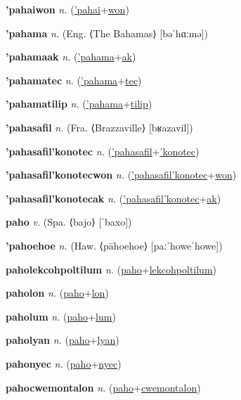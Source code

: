 \textbf{\hypertarget{'pahaiwon}{'pahaiwon}} \textit{n.} (\hyperlink{'pahai}{'pahai}+\allowbreak \hyperlink{won}{won})


\textbf{\hypertarget{'pahama}{'pahama}} \textit{n.} (Eng. ⟨The Bahamas⟩ [bəˈhɑːmə])


\textbf{\hypertarget{'pahamaak}{'pahamaak}} \textit{n.} (\hyperlink{'pahama}{'pahama}+\allowbreak \hyperlink{ak}{ak})


\textbf{\hypertarget{'pahamatec}{'pahamatec}} \textit{n.} (\hyperlink{'pahama}{'pahama}+\allowbreak \hyperlink{tec}{tec})


\textbf{\hypertarget{'pahamatilip}{'pahamatilip}} \textit{n.} (\hyperlink{'pahama}{'pahama}+\allowbreak \hyperlink{tilip}{tilip})


\textbf{\hypertarget{'pahasafil}{'pahasafil}} \textit{n.} (Fra. ⟨Brazzaville⟩ [bʁazavil])


\textbf{\hypertarget{'pahasafil'konotec}{'pahasafil'konotec}} \textit{n.} (\hyperlink{'pahasafil}{'pahasafil}+\allowbreak \hyperlink{'konotec}{'konotec})


\textbf{\hypertarget{'pahasafil'konotecwon}{'pahasafil'konotecwon}} \textit{n.} (\hyperlink{'pahasafil'konotec}{'pahasafil'konotec}+\allowbreak \hyperlink{won}{won})


\textbf{\hypertarget{'pahasafil'konotecak}{'pahasafil'konotecak}} \textit{n.} (\hyperlink{'pahasafil'konotec}{'pahasafil'konotec}+\allowbreak \hyperlink{ak}{ak})


\textbf{\hypertarget{paho}{paho}} \textit{v.} (Spa. ⟨bajo⟩ [ˈbaxo])


\textbf{\hypertarget{'pahoehoe}{'pahoehoe}} \textit{n.} (Haw. ⟨pāhoehoe⟩ [paːˈhoweˈhowe])


\textbf{\hypertarget{paholekcohpoltilum}{paholekcohpoltilum}} \textit{n.} (\hyperlink{paho}{paho}+\allowbreak \hyperlink{lekcohpoltilum}{lekcohpoltilum})


\textbf{\hypertarget{paholon}{paholon}} \textit{n.} (\hyperlink{paho}{paho}+\allowbreak \hyperlink{lon}{lon})


\textbf{\hypertarget{paholum}{paholum}} \textit{n.} (\hyperlink{paho}{paho}+\allowbreak \hyperlink{lum}{lum})


\textbf{\hypertarget{paholyan}{paholyan}} \textit{n.} (\hyperlink{paho}{paho}+\allowbreak \hyperlink{lyan}{lyan})


\textbf{\hypertarget{pahonyec}{pahonyec}} \textit{n.} (\hyperlink{paho}{paho}+\allowbreak \hyperlink{nyec}{nyec})


\textbf{\hypertarget{pahocwemontalon}{pahocwemontalon}} \textit{n.} (\hyperlink{paho}{paho}+\allowbreak \hyperlink{cwemontalon}{cwemontalon})


